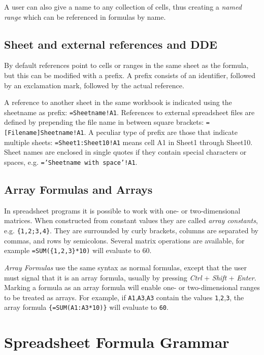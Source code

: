 \documentclass[conference]{IEEEtran}
\begin{document}
A user can also give a name to any collection of cells, thus creating a \emph{named range} which can be referenced in formulas by name.

\subsection{Sheet and external references and DDE}
\label{subsection:ExternalRefsDDE}

By default references point to cells or ranges in the same sheet as the formula, but this can be modified with a prefix. A prefix consists of an identifier, followed by an exclamation mark, followed by the actual reference.

A reference to another sheet in the same workbook is indicated using the sheetname as prefix: \texttt{=Sheetname!A1}. References to external spreadsheet files are defined by prepending the file name in between square brackets: \texttt{=[Filename]Sheetname!A1}.
A peculiar type of prefix are those that indicate multiple sheets: \texttt{=Sheet1:Sheet10!A1} means cell A1 in Sheet1 through Sheet10.
Sheet names are enclosed in single quotes if they contain special characters or spaces, e.g. \texttt{='Sheetname with space'!A1}. 

\subsection{Array Formulas and Arrays}
\label{sec:arrayformulas}
In spreadsheet programs it is possible to work with one- or two-dimensional matrices. When constructed from constant values they are called \emph{array constants}, e.g. \texttt{\{1,2;3,4\}}.
They are surrounded by curly brackets, columns are separated by commas, and rows by semicolons.
Several matrix operations are available, for example \texttt{=SUM(\{1,2,3\}*10)} will evaluate to 60.

\emph{Array Formulas} use the same syntax as normal formulas, except that the user must signal that it is an array formula, usually by pressing \emph{Ctrl} + \emph{Shift} + \emph{Enter}.
Marking a formula as an array formula will enable one- or two-dimensional ranges to be treated as arrays.
For example, if \texttt{A1},\texttt{A3},\texttt{A3} contain the values \texttt{1},\texttt{2},\texttt{3}, the array formula \texttt{\{=SUM(A1:A3*10)\}} will evaluate to \texttt{60}.

\section{Spreadsheet Formula Grammar}
\label{section:grammar}
\end{document}
